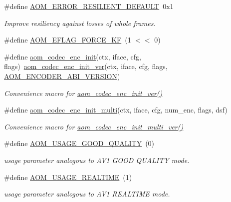 \begin{DoxyCompactItemize}
\#define \hyperlink{group__encoder_ga4118658e1fc1590f72fec38478ae230d}{A\+O\+M\+\_\+\+E\+R\+R\+O\+R\+\_\+\+R\+E\+S\+I\+L\+I\+E\+N\+T\+\_\+\+D\+E\+F\+A\+U\+LT}~0x1
\begin{DoxyCompactList}\small\item\em Improve resiliency against losses of whole frames. \end{DoxyCompactList}\item 
\#define \hyperlink{group__encoder_ga86a6a9053205149cccc98481b5460337}{A\+O\+M\+\_\+\+E\+F\+L\+A\+G\+\_\+\+F\+O\+R\+C\+E\+\_\+\+KF}~(1 $<$$<$ 0)
\item 
\#define \hyperlink{group__encoder_gaade68a7d33d30f97dc9a596aa5e065d8}{aom\+\_\+codec\+\_\+enc\+\_\+init}(ctx,  iface,  cfg,  flags)~\hyperlink{group__encoder_ga205cf6f9460f4b4a842872012ef6fb0c}{aom\+\_\+codec\+\_\+enc\+\_\+init\+\_\+ver}(ctx, iface, cfg, flags, \hyperlink{group__encoder_gae4af664f2049d5b7d7b644d9a61d497c}{A\+O\+M\+\_\+\+E\+N\+C\+O\+D\+E\+R\+\_\+\+A\+B\+I\+\_\+\+V\+E\+R\+S\+I\+ON})
\begin{DoxyCompactList}\small\item\em Convenience macro for \hyperlink{group__encoder_ga205cf6f9460f4b4a842872012ef6fb0c}{aom\+\_\+codec\+\_\+enc\+\_\+init\+\_\+ver()} \end{DoxyCompactList}\item 
\#define \hyperlink{group__encoder_ga4410c689b0f8d0b75aca881ff7b25253}{aom\+\_\+codec\+\_\+enc\+\_\+init\+\_\+multi}(ctx,  iface,  cfg,  num\+\_\+enc,  flags,  dsf)
\begin{DoxyCompactList}\small\item\em Convenience macro for \hyperlink{group__encoder_gad3dfb2298402298abadb2c1b059b5f0b}{aom\+\_\+codec\+\_\+enc\+\_\+init\+\_\+multi\+\_\+ver()} \end{DoxyCompactList}\item 
\mbox{\label{group__encoder_ga03ca3defc61e1d70c34e9d94e7cee823}} 
\#define \hyperlink{group__encoder_ga03ca3defc61e1d70c34e9d94e7cee823}{A\+O\+M\+\_\+\+U\+S\+A\+G\+E\+\_\+\+G\+O\+O\+D\+\_\+\+Q\+U\+A\+L\+I\+TY}~(0)
\begin{DoxyCompactList}\small\item\em usage parameter analogous to A\+V1 G\+O\+OD Q\+U\+A\+L\+I\+TY mode. \end{DoxyCompactList}\item 
\mbox{\label{group__encoder_gae2cc24d3083099df8eb60ad65f81c62f}} 
\#define \hyperlink{group__encoder_gae2cc24d3083099df8eb60ad65f81c62f}{A\+O\+M\+\_\+\+U\+S\+A\+G\+E\+\_\+\+R\+E\+A\+L\+T\+I\+ME}~(1)
\begin{DoxyCompactList}\small\item\em usage parameter analogous to A\+V1 R\+E\+A\+L\+T\+I\+ME mode. \end{DoxyCompactList}\end{DoxyCompactItemize}
